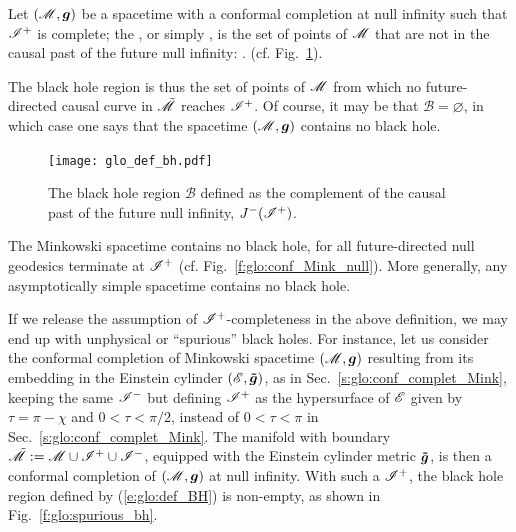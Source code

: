 \begin{greybox}
Let $(\mathscr{M},\bm{g})$ be a spacetime with a conformal completion at null infinity
such that $\mathscr{I}^+$ is complete;
the , or simply ,
is the set of points of $\mathscr{M}$ that are not in the causal past of the future null infinity:
\be \label{e:glo:def_BH}
     .
\ee
(cf. Fig.~\ref{f:glo:def_bh}).
\end{greybox}
The black hole region is thus the set of points of $\mathscr{M}$
from which no future-directed causal curve in $\tilde{\mathscr{M}}$ reaches $\mathscr{I}^+$.
Of course, it may be that $\mathscr{B} = \varnothing$, in which case one
says that the spacetime $(\mathscr{M},\bm{g})$ contains no black hole.


\begin{figure}
\centerline{\texttt{[image: glo\_def\_bh.pdf]}}
\caption[]{\label{f:glo:def_bh} \footnotesize
The black hole region $\mathscr{B}$ defined as the complement of
the causal past of the future null infinity, $J^-(\mathscr{I}^+)$.}
\end{figure}


\begin{example}
The Minkowski spacetime contains no black hole, for all future-directed null geodesics
terminate at $\mathscr{I}^+$ (cf. Fig.~\ref{f:glo:conf_Mink_null}).
More generally, any asymptotically simple spacetime contains no black hole.
\end{example}

\begin{remark} \label{s:glo:spurious_bh}
If we release the assumption of $\mathscr{I}^+$-completeness in the above definition,
we may end up with unphysical or ``spurious'' black holes.
For instance, let us consider the conformal completion of Minkowski spacetime
$(\mathscr{M},\bm{g})$ resulting from its embedding in the Einstein cylinder
$(\mathscr{E},\bm{\tilde{g}})$, as in
Sec.~\ref{s:glo:conf_complet_Mink},
keeping the same $\mathscr{I}^-$ but
defining $\mathscr{I}^+$ as the
hypersurface of $\mathscr{E}$ given by $\tau = \pi - \chi$
and $0<\tau<\pi/2$, instead of  $0<\tau<\pi$ in Sec.~\ref{s:glo:conf_complet_Mink}.
The manifold with boundary $\tilde{\mathscr{M}} := \mathscr{M} \cup \mathscr{I}^+ \cup \mathscr{I}^-$,
equipped with the Einstein cylinder metric $\bm{\tilde g}$, is then a conformal completion
of $(\mathscr{M},\bm{g})$ at null infinity. With such a $\mathscr{I}^+$, the black hole region
defined by (\ref{e:glo:def_BH}) is non-empty, as shown in Fig.~\ref{f:glo:spurious_bh}.
\end{remark}

